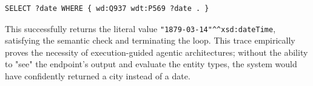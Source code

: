 \noindent
\begin{minipage}{\textwidth}
\begin{lstlisting}[basicstyle=\ttfamily\footnotesize, frame=single, caption={Iteration 2: Corrected Query}, label={lst:corrected_query}]
SELECT ?date WHERE { wd:Q937 wdt:P569 ?date . }
\end{lstlisting}
\end{minipage}

This successfully returns the literal value \texttt{"1879-03-14"\^{}\^{}xsd:dateTime}, satisfying the semantic check and terminating the loop. This trace empirically proves the necessity of execution-guided agentic architectures; without the ability to "see" the endpoint's output and evaluate the entity types, the system would have confidently returned a city instead of a date.